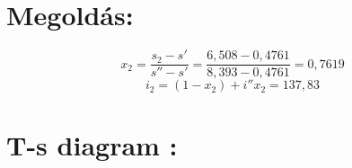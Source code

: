 \vspace{2mm}
\section*{Megoldás:}

\begin{equation}
x_2 = \frac{s_2-s'}{s''-s'} =\frac{6,508-0,4761}{8,393-0,4761}=0,7619
\end{equation}
\begin{equation}
i_2=(1-x_2)+i''x_2
=137,83
\end{equation}
\vspace{2mm}
\section*{T-s diagram :}
\vspace{2mm}
